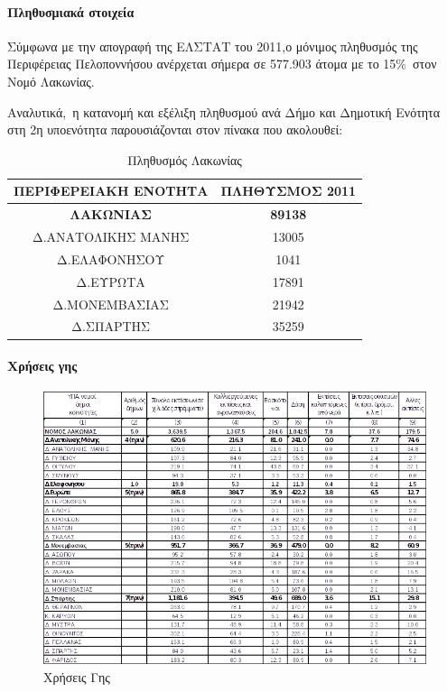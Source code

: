 \documentclass[12pt]{article}
\begin{document}
	\paragraph{Πληθυσμιακά στοιχεία}
	
	Σύμφωνα με την απογραφή της ΕΛΣΤΑΤ του 2011,ο μόνιμος πληθυσμός της Περιφέρειας Πελοποννήσου ανέρχεται σήμερα σε 577.903 άτομα με το 15\% στον Νομό Λακωνίας.
	
	Αναλυτικά, η κατανομή και εξέλιξη πληθυσμού ανά Δήμο και Δημοτική Ενότητα στη 2η υποενότητα παρουσιάζονται στον πίνακα που ακολουθεί:
	
	\begin{table}[H]
		\centering
		\begin{tabular}{|c|c|}
			\hline
			\textbf{ΠΕΡΙΦΕΡΕΙΑΚΗ ΕΝΟΤΗΤΑ} & \textbf{ΠΛΗΘΥΣΜΟΣ 2011} \\ \hline
			\textbf{ΛΑΚΩΝΙΑΣ} & \textbf{89138} \\ \hline
			Δ.ΑΝΑΤΟΛΙΚΗΣ ΜΑΝΗΣ & 13005 \\ \hline
			Δ.ΕΛΑΦΟΝΗΣΟΥ & 1041 \\ \hline
			Δ.ΕΥΡΩΤΑ & 17891 \\ \hline
			Δ.ΜΟΝΕΜΒΑΣΙΑΣ & 21942 \\ \hline
			Δ.ΣΠΑΡΤΗΣ & 35259 \\ \hline
		\end{tabular}
		\caption{Πληθυσμός Λακωνίας}
		\label{The label}
	\end{table}

	\paragraph{Χρήσεις γης}
	
	\begin{figure} [H]
		\begin{center}
			\includegraphics [scale = 0.80] {xriseis4.png}
			\caption{Χρήσεις Γης}
		\end{center}
	\end{figure}
\end{document}
